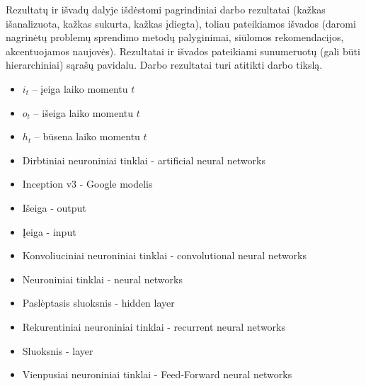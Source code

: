\documentclass{VUMIFPSbakalaurinis}
\begin{document}
Rezultatų ir išvadų dalyje išdėstomi pagrindiniai darbo rezultatai (kažkas
išanalizuota, kažkas sukurta, kažkas įdiegta), toliau pateikiamos išvados
(daromi nagrinėtų problemų sprendimo metodų palyginimai, siūlomos
rekomendacijos, akcentuojamos naujovės). Rezultatai ir išvados pateikiami
sunumeruotų (gali būti hierarchiniai) sąrašų pavidalu. Darbo rezultatai turi
atitikti darbo tikslą.

\printbibliography[heading=bibintoc]  %


\begin{itemize}
	\item $i_t$ – įeiga laiko momentu $t$
	\item $o_t$ – išeiga laiko momentu $t$
	\item $h_t$ – būsena laiko momentu $t$
\end{itemize}



\begin{itemize}
	\item Dirbtiniai neuroniniai tinklai - artificial neural networks
	\item Inception v3 - Google modelis
	\item Išeiga - output
	\item Įeiga - input
	\item Konvoliuciniai neuroniniai tinklai - convolutional neural networks
	\item Neuroniniai tinklai - neural networks
	\item Paslėptasis sluoksnis - hidden layer
	\item Rekurentiniai neuroniniai tinklai - recurrent neural networks
	\item Sluoksnis - layer
	\item Vienpusiai neuroniniai tinklai - Feed-Forward neural networks
\end{itemize}
\end{document}
